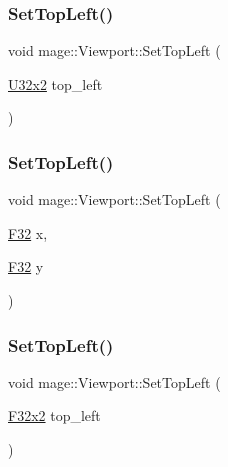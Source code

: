 \hypertarget{classmage_1_1_viewport_a46585a2e52c3d8f3f51d0dd25a85109d}{}\label{classmage_1_1_viewport_a46585a2e52c3d8f3f51d0dd25a85109d} 
\subsubsection{\texorpdfstring{Set\+Top\+Left()}{SetTopLeft()}\hspace{0.1cm}{\footnotesize\ttfamily [2/4]}}
{\footnotesize\ttfamily void mage\+::\+Viewport\+::\+Set\+Top\+Left (\begin{DoxyParamCaption}\item[{\hyperlink{namespacemage_a88e05bff0300120c013285d3dcad95c5}{U32x2}}]{top\+\_\+left }\end{DoxyParamCaption})\hspace{0.3cm}{\ttfamily [noexcept]}}

\hypertarget{classmage_1_1_viewport_a982a30c583445f04516cfae876667e62}{}\label{classmage_1_1_viewport_a982a30c583445f04516cfae876667e62} 
\subsubsection{\texorpdfstring{Set\+Top\+Left()}{SetTopLeft()}\hspace{0.1cm}{\footnotesize\ttfamily [3/4]}}
{\footnotesize\ttfamily void mage\+::\+Viewport\+::\+Set\+Top\+Left (\begin{DoxyParamCaption}\item[{\hyperlink{namespacemage_aa97e833b45f06d60a0a9c4fc22ae02c0}{F32}}]{x,  }\item[{\hyperlink{namespacemage_aa97e833b45f06d60a0a9c4fc22ae02c0}{F32}}]{y }\end{DoxyParamCaption})\hspace{0.3cm}{\ttfamily [noexcept]}}

\hypertarget{classmage_1_1_viewport_a1a8288b66a42e6519d71c57d06af099a}{}\label{classmage_1_1_viewport_a1a8288b66a42e6519d71c57d06af099a} 
\subsubsection{\texorpdfstring{Set\+Top\+Left()}{SetTopLeft()}\hspace{0.1cm}{\footnotesize\ttfamily [4/4]}}
{\footnotesize\ttfamily void mage\+::\+Viewport\+::\+Set\+Top\+Left (\begin{DoxyParamCaption}\item[{\hyperlink{namespacemage_aa87237ad091f5cd7da612b8523fc108f}{F32x2}}]{top\+\_\+left }\end{DoxyParamCaption})\hspace{0.3cm}{\ttfamily [noexcept]}}

